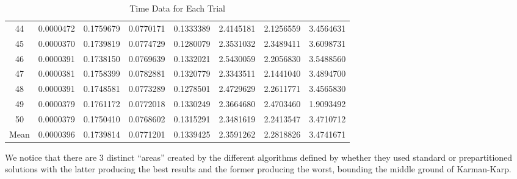 \documentclass[11pt]{scrartcl}
\theoremstyle{dotlessP}
\theoremstyle{dotlessN}
\theoremstyle{dotN}
\begin{document}
\begin{table}[H]
{\begin{tabular}{c|c|c|c|c|c|c|c}
44    & 0.0000472 & 0.1759679       & 0.0770171     & 0.1333389           & 2.4145181          & 2.1256559        & 3.4564631              \\
45    & 0.0000370 & 0.1739819       & 0.0774729     & 0.1280079           & 2.3531032          & 2.3489411        & 3.6098731              \\
46    & 0.0000391 & 0.1738150       & 0.0769639     & 0.1332021           & 2.5430059          & 2.2056830        & 3.5488560              \\
47    & 0.0000381 & 0.1758399       & 0.0782881     & 0.1320779           & 2.3343511          & 2.1441040        & 3.4894700              \\
48    & 0.0000391 & 0.1748581       & 0.0773289     & 0.1278501           & 2.4729629          & 2.2611771        & 3.4565830              \\
49    & 0.0000379 & 0.1761172       & 0.0772018     & 0.1330249           & 2.3664680          & 2.4703460        & 1.9093492              \\
50    & 0.0000379 & 0.1750410       & 0.0768602     & 0.1315291           & 2.3481619          & 2.2413547        & 3.4710712              \\
\hline
Mean  & 0.0000396 & 0.1739814       & 0.0771201     & 0.1339425           & 2.3591262          & 2.2818826        & 3.4741671             
\end{tabular}}
\caption{Time Data for Each Trial}
\end{table}
We notice that there are 3 distinct ``areas'' created by the different algorithms defined by whether they used
standard or prepartitioned solutions with the latter producing the best results and the former producing the
worst, bounding the middle ground of Karman-Karp. 
\end{document}
